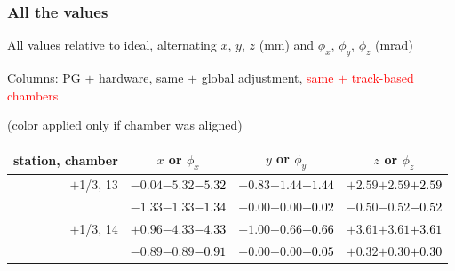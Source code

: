 \documentclass[compress]{beamer}
\begin{document}
\begin{frame}
\frametitle{All the values}
\tiny

All values relative to ideal, alternating $x$, $y$, $z$ (mm) and $\phi_x$, $\phi_y$, $\phi_z$ (mrad)

Columns: PG $+$ hardware, same $+$ global adjustment, \textcolor{red}{same $+$ track-based chambers}

\hfill (color applied only if chamber was aligned)

\vfill
\renewcommand{\arraystretch}{1.1}
\begin{tabular}{r | c | c | c}
station, chamber & $x$ or $\phi_x$ & $y$ or $\phi_y$ & $z$ or $\phi_z$ \\\hline
$+$1/3, 13 & $-0.04$\hspace{0.1 cm}$-5.32$\hspace{0.1 cm}\textcolor{black}{$-5.32$} & $+0.83$\hspace{0.1 cm}$+1.44$\hspace{0.1 cm}\textcolor{black}{$+1.44$} & $+2.59$\hspace{0.1 cm}$+2.59$\hspace{0.1 cm}\textcolor{black}{$+2.59$} \\
           & $-1.33$\hspace{0.1 cm}$-1.33$\hspace{0.1 cm}\textcolor{black}{$-1.34$} & $+0.00$\hspace{0.1 cm}$+0.00$\hspace{0.1 cm}\textcolor{black}{$-0.02$} & $-0.50$\hspace{0.1 cm}$-0.52$\hspace{0.1 cm}\textcolor{black}{$-0.52$} \\
$+$1/3, 14 & $+0.96$\hspace{0.1 cm}$-4.33$\hspace{0.1 cm}\textcolor{black}{$-4.33$} & $+1.00$\hspace{0.1 cm}$+0.66$\hspace{0.1 cm}\textcolor{black}{$+0.66$} & $+3.61$\hspace{0.1 cm}$+3.61$\hspace{0.1 cm}\textcolor{black}{$+3.61$} \\
           & $-0.89$\hspace{0.1 cm}$-0.89$\hspace{0.1 cm}\textcolor{black}{$-0.91$} & $+0.00$\hspace{0.1 cm}$-0.00$\hspace{0.1 cm}\textcolor{black}{$-0.05$} & $+0.32$\hspace{0.1 cm}$+0.30$\hspace{0.1 cm}\textcolor{black}{$+0.30$} \\

\end{tabular}
\end{frame}
\end{document}
